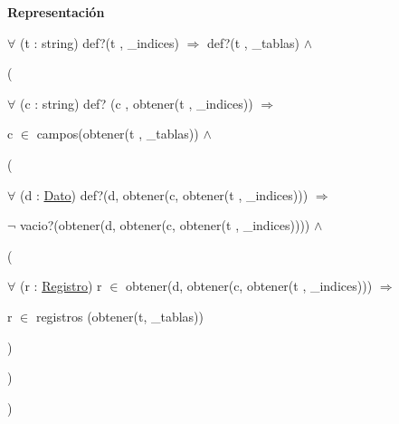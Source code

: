 \begin{Indent}{\bf Representación}
{$\forall$ (t \-: string) def?(t , \-\_\-indices) $\Rightarrow$ def?(t , \-\_\-tablas) $\land$
\begin{DoxyItemize}
\item (
\begin{DoxyItemize}
\item $\forall$ (c \-: string) def? (c , obtener(t , \-\_\-indices)) $\Rightarrow$
\begin{DoxyItemize}
\item c $\in$ campos(obtener(t , \-\_\-tablas)) $\land$
\item (
\begin{DoxyItemize}
\item $\forall$ (d \-: \hyperlink{classDato}{Dato}) def?(d, obtener(c, obtener(t , \-\_\-indices))) $\Rightarrow$
\begin{DoxyItemize}
\item $\lnot$ vacio?(obtener(d, obtener(c, obtener(t , \-\_\-indices)))) $\land$
\item (
\begin{DoxyItemize}
\item $\forall$ (r \-: \hyperlink{classRegistro}{Registro}) r $\in$ obtener(d, obtener(c, obtener(t , \-\_\-indices))) $\Rightarrow$
\begin{DoxyItemize}
\item r $\in$ registros (obtener(t, \-\_\-tablas))
\end{DoxyItemize}
\end{DoxyItemize}
\item )
\end{DoxyItemize}
\end{DoxyItemize}
\item )
\end{DoxyItemize}
\end{DoxyItemize}
\item )
\end{DoxyItemize}

}
\end{Indent}
